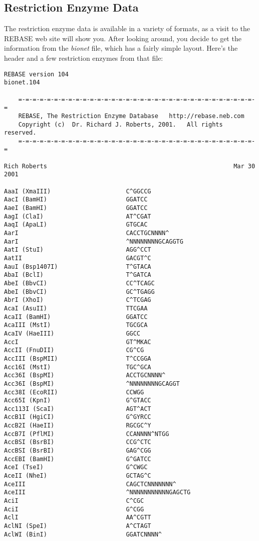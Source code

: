 \subsection{Restriction Enzyme Data}
The restriction enzyme data is available in a variety of formats, as a visit to the REBASE web site will show you. After looking around, you decide to get the information from the \textit{bionet} file, which has a fairly simple layout. Here's the header and a few restriction enzymes from that file: 

\begin{lstlisting}
REBASE version 104                                              bionet.104
 
    =-=-=-=-=-=-=-=-=-=-=-=-=-=-=-=-=-=-=-=-=-=-=-=-=-=-=-=-=-=-=-=-=-=
    REBASE, The Restriction Enzyme Database   http://rebase.neb.com
    Copyright (c)  Dr. Richard J. Roberts, 2001.   All rights reserved.
    =-=-=-=-=-=-=-=-=-=-=-=-=-=-=-=-=-=-=-=-=-=-=-=-=-=-=-=-=-=-=-=-=-=
 
Rich Roberts                                                    Mar 30 2001
 
AaaI (XmaIII)                     C^GGCCG
AacI (BamHI)                      GGATCC
AaeI (BamHI)                      GGATCC
AagI (ClaI)                       AT^CGAT
AaqI (ApaLI)                      GTGCAC
AarI                              CACCTGCNNNN^
AarI                              ^NNNNNNNNGCAGGTG
AatI (StuI)                       AGG^CCT
AatII                             GACGT^C
AauI (Bsp1407I)                   T^GTACA
AbaI (BclI)                       T^GATCA
AbeI (BbvCI)                      CC^TCAGC
AbeI (BbvCI)                      GC^TGAGG
AbrI (XhoI)                       C^TCGAG
AcaI (AsuII)                      TTCGAA
AcaII (BamHI)                     GGATCC
AcaIII (MstI)                     TGCGCA
AcaIV (HaeIII)                    GGCC
AccI                              GT^MKAC
AccII (FnuDII)                    CG^CG
AccIII (BspMII)                   T^CCGGA
Acc16I (MstI)                     TGC^GCA
Acc36I (BspMI)                    ACCTGCNNNN^
Acc36I (BspMI)                    ^NNNNNNNNGCAGGT
Acc38I (EcoRII)                   CCWGG
Acc65I (KpnI)                     G^GTACC
Acc113I (ScaI)                    AGT^ACT
AccB1I (HgiCI)                    G^GYRCC
AccB2I (HaeII)                    RGCGC^Y
AccB7I (PflMI)                    CCANNNN^NTGG
AccBSI (BsrBI)                    CCG^CTC
AccBSI (BsrBI)                    GAG^CGG
AccEBI (BamHI)                    G^GATCC
AceI (TseI)                       G^CWGC
AceII (NheI)                      GCTAG^C
AceIII                            CAGCTCNNNNNNN^
AceIII                            ^NNNNNNNNNNNGAGCTG
AciI                              C^CGC
AciI                              G^CGG
AclI                              AA^CGTT
AclNI (SpeI)                      A^CTAGT
AclWI (BinI)                      GGATCNNNN^
\end{lstlisting}

